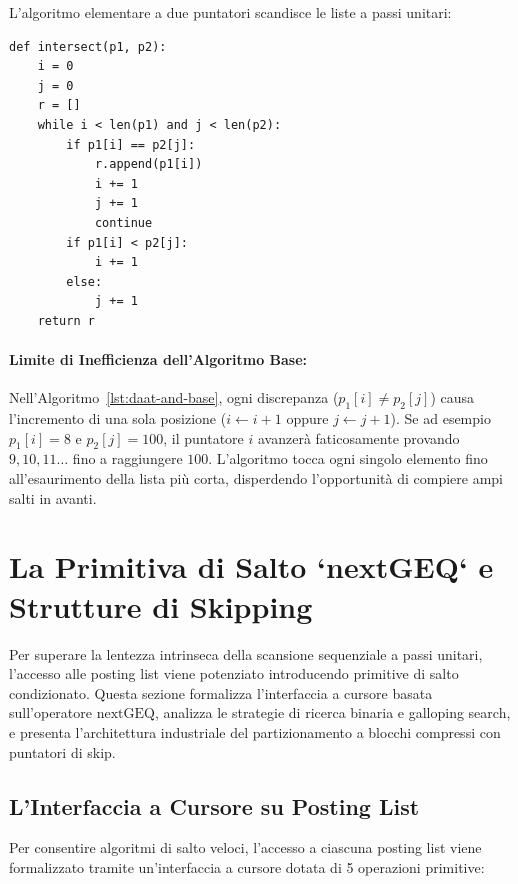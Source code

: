 L'algoritmo elementare a due puntatori scandisce le liste a passi unitari:

\begin{lstlisting}[style=pythoncode, caption={Algoritmo base di intersezione DAAT AND a due puntatori.}, label={lst:daat-and-base}]
def intersect(p1, p2):
    i = 0
    j = 0
    r = []
    while i < len(p1) and j < len(p2):
        if p1[i] == p2[j]:
            r.append(p1[i])
            i += 1
            j += 1
            continue
        if p1[i] < p2[j]:
            i += 1
        else:
            j += 1
    return r
\end{lstlisting}

\paragraph{Limite di Inefficienza dell'Algoritmo Base:}
Nell'Algoritmo~\ref{lst:daat-and-base}, ogni discrepanza ($p_1[i] \neq p_2[j]$) causa l'incremento di una sola posizione ($i \gets i+1$ oppure $j \gets j+1$). Se ad esempio $p_1[i] = 8$ e $p_2[j] = 100$, il puntatore $i$ avanzer\`a faticosamente provando $9, 10, 11 \dots$ fino a raggiungere $100$. L'algoritmo tocca ogni singolo elemento fino all'esaurimento della lista pi\`u corta, disperdendo l'opportunit\`a di compiere ampi salti in avanti.

\FloatBarrier
\section{La Primitiva di Salto `nextGEQ` e Strutture di Skipping}
\label{sec:nextgeq-primitiva-skipping}

Per superare la lentezza intrinseca della scansione sequenziale a passi unitari, l'accesso alle posting list viene potenziato introducendo primitive di salto condizionato. Questa sezione formalizza l'interfaccia a cursore basata sull'operatore $\text{nextGEQ}$, analizza le strategie di ricerca binaria e galloping search, e presenta l'architettura industriale del partizionamento a blocchi compressi con puntatori di skip.

\FloatBarrier
\subsection{L'Interfaccia a Cursore su Posting List}
\label{subsec:interfaccia-cursore-posting-list}
Per consentire algoritmi di salto veloci, l'accesso a ciascuna posting list viene formalizzato tramite un'interfaccia a cursore dotata di 5 operazioni primitive:

